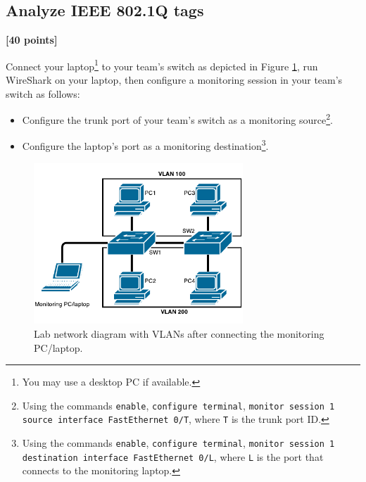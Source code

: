 \documentclass[pdftex,12pt,a4paper]{article}
\begin{document}
        \subsection{Analyze IEEE 802.1Q tags}\label{sec:analyze}
            \begin{flushright}
                \textbf{[40 points]}
            \end{flushright}

            Connect your laptop\footnote{You may use a desktop PC if
            available.} to your team's switch as depicted in Figure
            \ref{fig:netdiag3}, run WireShark on your laptop, then configure a
            monitoring session in your team's switch as follows:
            \begin{itemize}
                \item Configure the trunk port of your team's switch as a
                    monitoring source\footnote{Using the commands
                    \texttt{enable}, \texttt{configure terminal},
                    \texttt{monitor session 1 source interface FastEthernet 0/T},
                    where \texttt{T} is the trunk port ID.}.
                \item Configure the laptop's port as a monitoring
                    destination\footnote{Using the commands \texttt{enable},
                    \texttt{configure terminal}, \texttt{monitor session 1
                    destination interface FastEthernet 0/L}, where \texttt{L} is the
                    port that connects to the monitoring laptop.}.
            \end{itemize}

            \begin{figure}[tbh]
                \centering
                \includegraphics[width=0.7\textwidth]{figures/netdiag3}
                \caption{Lab network diagram with VLANs after connecting the
                monitoring PC/laptop.}
                \label{fig:netdiag3}
            \end{figure}
\end{document}
